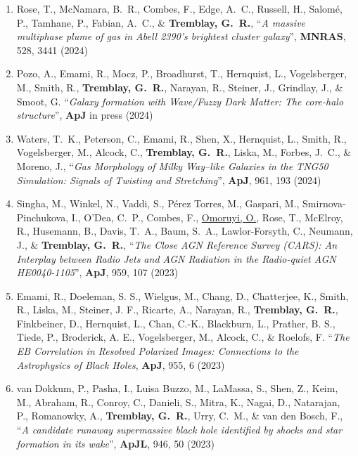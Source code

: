 \documentclass[11pt]{article}
\begin{document}
\begin{enumerate}[resume]
\item Rose, T.,  McNamara, B.~R.,  Combes, F.,  Edge, A.~C., Russell, H., Salom\'{e}, P., Tamhane, P., Fabian, A.~C., \& \textbf{Tremblay, G.~R.}, ``\textit{A massive multiphase plume of gas in Abell 2390's brightest cluster galaxy}'', \textbf{MNRAS}, 528, 3441 (2024)

\item Pozo, A., Emami, R., Mocz, P., Broadhurst, T., Hernquist, L., Vogelsberger, M., Smith, R., \textbf{Tremblay, G.~R.}, Narayan, R., Steiner, J., Grindlay, J., \& Smoot, G. ``\textit{Galaxy formation with Wave/Fuzzy Dark Matter: The core-halo structure}'', \textbf{ApJ} in press (2024)

\item Waters, T.~K., Peterson, C., Emami, R., Shen, X., Hernquist, L., Smith, R., Vogelsberger, M., Alcock, C., \textbf{Tremblay, G.~R.}, Liska, M., Forbes, J.~C., \&  Moreno, J., ``\textit{Gas Morphology of Milky Way–like Galaxies in the TNG50 Simulation: Signals of Twisting and Stretching}'', \textbf{ApJ}, 961, 193 (2024)


\item Singha, M.,  Winkel, N., Vaddi, S., P\'{e}rez Torres, M., Gaspari, M., Smirnova-Pinchukova, I., O'Dea, C.~P.,  Combes, F.,  \uline{Omoruyi, O.}, Rose, T., McElroy, R.,  Husemann, B.,  Davis, T.~A., Baum, S.~A., Lawlor-Forsyth, C.,  Neumann, J., \& \textbf{Tremblay, G.~R.}, ``\textit{The Close AGN Reference Survey (CARS): An Interplay between Radio Jets and AGN Radiation in the Radio-quiet AGN HE0040-1105}'', \textbf{ApJ}, 959, 107 (2023)

\item Emami, R., Doeleman, S. S., Wielgus, M., Chang, D., Chatterjee, K., Smith, R., Liska, M., Steiner, J. F., Ricarte, A., Narayan, R., \textbf{Tremblay, G.~R.}, Finkbeiner, D., Hernquist, L., Chan, C.-K., Blackburn, L., Prather, B. S., Tiede, P., Broderick, A. E., Vogelsberger, M., Alcock, C., \& Roelofs, F. ``\textit{The EB Correlation in Resolved Polarized Images: Connections to the Astrophysics of Black Holes}, \textbf{ApJ}, 955, 6 (2023)


\item van Dokkum, P., Pasha, I., Luisa Buzzo, M., LaMassa, S., Shen, Z., Keim, M., Abraham, R., Conroy, C., Danieli, S., Mitra, K., Nagai, D., Natarajan, P., Romanowky, A., \textbf{Tremblay, G.~R.}, Urry, C.~M., \& van den Bosch, F., ``\textit{A candidate runaway supermassive black hole identified by shocks and star formation in its wake}'', \textbf{ApJL}, 946, 50 (2023)



\end{enumerate}
\end{document}
